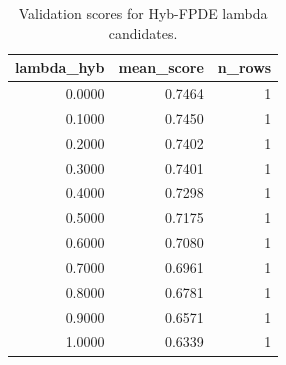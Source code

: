 \begin{table}[t]
\caption{Validation scores for Hyb-FPDE lambda candidates.}
\label{tab:lambda_distribution_computed}
\centering
\begin{tabular}{rrr}
\toprule
lambda\_hyb & mean\_score & n\_rows \\
\midrule
0.0000 & 0.7464 & 1 \\
0.1000 & 0.7450 & 1 \\
0.2000 & 0.7402 & 1 \\
0.3000 & 0.7401 & 1 \\
0.4000 & 0.7298 & 1 \\
0.5000 & 0.7175 & 1 \\
0.6000 & 0.7080 & 1 \\
0.7000 & 0.6961 & 1 \\
0.8000 & 0.6781 & 1 \\
0.9000 & 0.6571 & 1 \\
1.0000 & 0.6339 & 1 \\
\bottomrule
\end{tabular}

\end{table}
